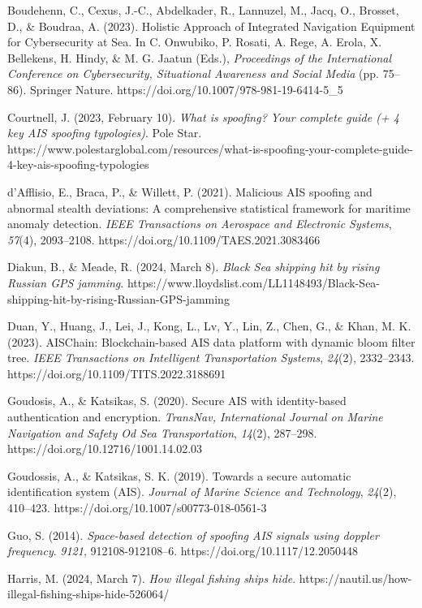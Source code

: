 \documentclass[
]{article}
\begin{document}
Boudehenn, C., Cexus, J.-C., Abdelkader, R., Lannuzel, M., Jacq, O.,
Brosset, D., \& Boudraa, A. (2023). Holistic Approach of Integrated
Navigation Equipment for Cybersecurity at Sea. In C. Onwubiko, P.
Rosati, A. Rege, A. Erola, X. Bellekens, H. Hindy, \& M. G. Jaatun
(Eds.), \emph{Proceedings of the International Conference on
Cybersecurity, Situational Awareness and Social Media} (pp. 75--86).
Springer Nature. https://doi.org/10.1007/978-981-19-6414-5\_5

Courtnell, J. (2023, February 10). \emph{What is spoofing? Your complete
guide (+ 4 key AIS spoofing typologies)}. Pole Star.
https://www.polestarglobal.com/resources/what-is-spoofing-your-complete-guide-4-key-ais-spoofing-typologies

d'Afflisio, E., Braca, P., \& Willett, P. (2021). Malicious AIS spoofing
and abnormal stealth deviations: A comprehensive statistical framework
for maritime anomaly detection. \emph{IEEE Transactions on Aerospace and
Electronic Systems}, \emph{57}(4), 2093--2108.
https://doi.org/10.1109/TAES.2021.3083466

Diakun, B., \& Meade, R. (2024, March 8). \emph{Black Sea shipping hit
by rising Russian GPS jamming}.
https://www.lloydslist.com/LL1148493/Black-Sea-shipping-hit-by-rising-Russian-GPS-jamming

Duan, Y., Huang, J., Lei, J., Kong, L., Lv, Y., Lin, Z., Chen, G., \&
Khan, M. K. (2023). AISChain: Blockchain-based AIS data platform with
dynamic bloom filter tree. \emph{IEEE Transactions on Intelligent
Transportation Systems}, \emph{24}(2), 2332--2343.
https://doi.org/10.1109/TITS.2022.3188691

Goudosis, A., \& Katsikas, S. (2020). Secure AIS with identity-based
authentication and encryption. \emph{TransNav, International Journal on
Marine Navigation and Safety Od Sea Transportation}, \emph{14}(2),
287--298. https://doi.org/10.12716/1001.14.02.03

Goudossis, A., \& Katsikas, S. K. (2019). Towards a secure automatic
identification system (AIS). \emph{Journal of Marine Science and
Technology}, \emph{24}(2), 410--423.
https://doi.org/10.1007/s00773-018-0561-3

Guo, S. (2014). \emph{Space-based detection of spoofing AIS signals
using doppler frequency}. \emph{9121}, 912108-912108--6.
https://doi.org/10.1117/12.2050448

Harris, M. (2024, March 7). \emph{How illegal fishing ships hide}.
https://nautil.us/how-illegal-fishing-ships-hide-526064/
\end{document}
